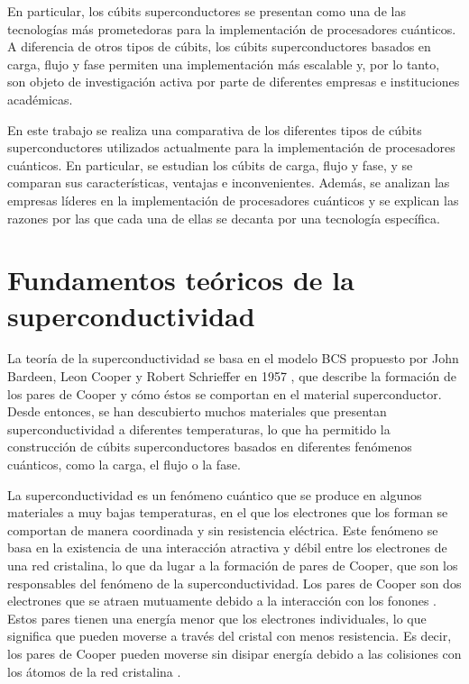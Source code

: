 \documentclass[12pt]{article}
\begin{document}
En particular, los cúbits superconductores se presentan como una de las tecnologías más prometedoras para la implementación de procesadores cuánticos. A diferencia de otros tipos de cúbits, los cúbits superconductores basados en carga, flujo y fase permiten una implementación más escalable y, por lo tanto, son objeto de investigación activa por parte de diferentes empresas e instituciones académicas.

En este trabajo se realiza una comparativa de los diferentes tipos de cúbits superconductores utilizados actualmente para la implementación de procesadores cuánticos. En particular, se estudian los cúbits de carga, flujo y fase, y se comparan sus características, ventajas e inconvenientes. Además, se analizan las empresas líderes en la implementación de procesadores cuánticos y se explican las razones por las que cada una de ellas se decanta por una tecnología específica.

\section{Fundamentos teóricos de la superconductividad}

La teoría de la superconductividad se basa en el modelo BCS propuesto por John Bardeen, Leon Cooper y Robert Schrieffer en 1957 \cite{bardeen_theory_1957}, que describe la formación de los pares de Cooper y cómo éstos se comportan en el material superconductor. Desde entonces, se han descubierto muchos materiales que presentan superconductividad a diferentes temperaturas, lo que ha permitido la construcción de cúbits superconductores basados en diferentes fenómenos cuánticos, como la carga, el flujo o la fase.

La superconductividad es un fenómeno cuántico que se produce en algunos materiales a muy bajas temperaturas, en el que los electrones que los forman se comportan de manera coordinada y sin resistencia eléctrica. Este fenómeno se basa en la existencia de una interacción atractiva y débil \cite{bardeen_theory_1957} entre los electrones de una red cristalina, lo que da lugar a la formación de pares de Cooper, que son los responsables del fenómeno de la superconductividad. Los pares de Cooper son dos electrones que se atraen mutuamente debido a la interacción con los fonones \cite{ferrell_knight_1959}. Estos pares tienen una energía menor que los electrones individuales, lo que significa que pueden moverse a través del cristal con menos resistencia. Es decir, los pares de Cooper pueden moverse sin disipar energía debido a las colisiones con los átomos de la red cristalina \cite{bardeen_microscopic_1957}.
\end{document}
